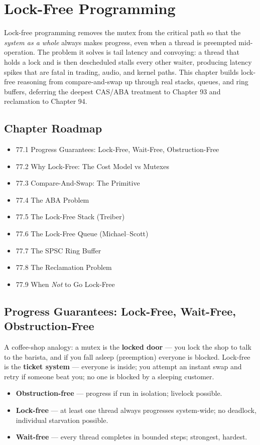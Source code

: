 \chapter{Lock-Free Programming}

Lock-free programming removes the mutex from the critical path so that the \emph{system as a whole} always makes progress, even when a thread is preempted mid-operation. The problem it solves is tail latency and convoying: a thread that holds a lock and is then descheduled stalls every other waiter, producing latency spikes that are fatal in trading, audio, and kernel paths. This chapter builds lock-free reasoning from compare-and-swap up through real stacks, queues, and ring buffers, deferring the deepest CAS/ABA treatment to Chapter 93 and reclamation to Chapter 94.

\section*{Chapter Roadmap}
\begin{itemize}
\item 77.1 Progress Guarantees: Lock-Free, Wait-Free, Obstruction-Free
\item 77.2 Why Lock-Free: The Cost Model vs Mutexes
\item 77.3 Compare-And-Swap: The Primitive
\item 77.4 The ABA Problem
\item 77.5 The Lock-Free Stack (Treiber)
\item 77.6 The Lock-Free Queue (Michael--Scott)
\item 77.7 The SPSC Ring Buffer
\item 77.8 The Reclamation Problem
\item 77.9 When \emph{Not} to Go Lock-Free
\end{itemize}

\section{Progress Guarantees: Lock-Free, Wait-Free, Obstruction-Free}
A coffee-shop analogy: a mutex is the \textbf{locked door} --- you lock the shop to talk to the barista, and if you fall asleep (preemption) everyone is blocked. Lock-free is the \textbf{ticket system} --- everyone is inside; you attempt an instant swap and retry if someone beat you; no one is blocked by a sleeping customer.

\begin{itemize}
\item \textbf{Obstruction-free} --- progress if run in isolation; livelock possible.
\item \textbf{Lock-free} --- at least one thread always progresses system-wide; no deadlock, individual starvation possible.
\item \textbf{Wait-free} --- every thread completes in bounded steps; strongest, hardest.
\end{itemize}

